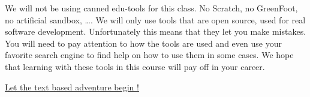 We will not be using canned edu-tools for this class. No Scratch, no GreenFoot, no artificial sandbox, \ldots. We will only use tools that are open source, used for real software development. Unfortunately this means that they let you make mistakes. You will need to pay attention to how the tools are used and even use your favorite search engine to find help on how to use them in some cases. We hope that learning with these tools in this course will pay off in your career. 

\begin{center}
    \underline{Let the text based adventure begin !}
\end{center}